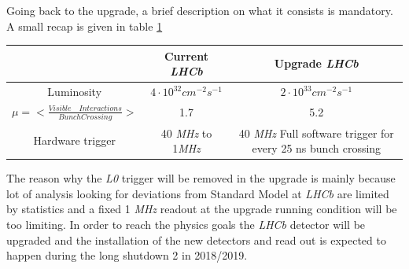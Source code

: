 \documentclass[paper=a4, fontsize=10pt]{scrartcl}
\numberwithin{equation}{section}		%
\numberwithin{figure}{section}			%
\numberwithin{table}{section}				%
\begin{document}
Going back to the upgrade, a brief description on what it consists is mandatory. A small recap is given in table \ref{table:runningCondition}
\begin{table}[h]
\centering
\begin{tabular}{|c|c|c|}
\hline
           & Current \textit{LHCb}          & Upgrade \textit{LHCb} \\ \hline
Luminosity & $4 \cdot 10 ^{32} cm^{-2}s^{-1}$ & $2\cdot 10^{33} cm^{-2}s^{-1}$ \\ \hline
$\mu=< \frac{Visible \quad Interactions}{Bunch Crossing}>$ & 1.7 & 5.2 \\ \hline
Hardware trigger & 40 \textit{MHz} to 1\textit{MHz} & 40 \textit{MHz} Full software trigger for every 25 ns bunch crossing \\ \hline
\end{tabular}
\label{table:runningCondition}
\end{table}
The reason why the \textit{L0} trigger will be removed in the upgrade is mainly because lot of analysis looking for deviations from Standard Model at \textit{LHCb} are limited by statistics and a fixed 1 \textit{MHz} readout at the upgrade running condition will be too limiting.
In order to reach the physics goals the \textit{LHCb} detector will be upgraded and the installation of the new detectors and read out is expected to happen during the long shutdown 2 in 2018/2019.
\end{document}

